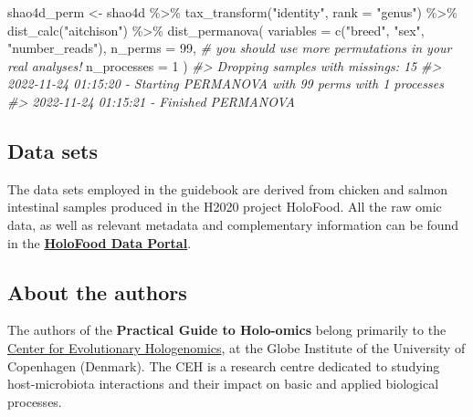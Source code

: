 \documentclass[
]{book}
\newenvironment{Shaded}{\begin{snugshade}}{\end{snugshade}}
\newcommand{\AttributeTok}[1]{\textcolor[rgb]{0.77,0.63,0.00}{#1}}
\newcommand{\CommentTok}[1]{\textcolor[rgb]{0.56,0.35,0.01}{\textit{#1}}}
\newcommand{\DecValTok}[1]{\textcolor[rgb]{0.00,0.00,0.81}{#1}}
\newcommand{\FunctionTok}[1]{\textcolor[rgb]{0.00,0.00,0.00}{#1}}
\newcommand{\NormalTok}[1]{#1}
\newcommand{\OtherTok}[1]{\textcolor[rgb]{0.56,0.35,0.01}{#1}}
\newcommand{\SpecialCharTok}[1]{\textcolor[rgb]{0.00,0.00,0.00}{#1}}
\newcommand{\StringTok}[1]{\textcolor[rgb]{0.31,0.60,0.02}{#1}}
\begin{document}
\begin{Shaded}
\begin{Highlighting}[]
\NormalTok{shao4d\_perm }\OtherTok{\textless{}{-}}\NormalTok{ shao4d }\SpecialCharTok{\%\textgreater{}\%}
  \FunctionTok{tax\_transform}\NormalTok{(}\StringTok{"identity"}\NormalTok{, }\AttributeTok{rank =} \StringTok{"genus"}\NormalTok{) }\SpecialCharTok{\%\textgreater{}\%}
  \FunctionTok{dist\_calc}\NormalTok{(}\StringTok{"aitchison"}\NormalTok{) }\SpecialCharTok{\%\textgreater{}\%}
  \FunctionTok{dist\_permanova}\NormalTok{(}
    \AttributeTok{variables =} \FunctionTok{c}\NormalTok{(}\StringTok{"breed"}\NormalTok{, }\StringTok{"sex"}\NormalTok{, }\StringTok{"number\_reads"}\NormalTok{),}
    \AttributeTok{n\_perms =} \DecValTok{99}\NormalTok{, }\CommentTok{\# you should use more permutations in your real analyses!}
    \AttributeTok{n\_processes =} \DecValTok{1}
\NormalTok{  )}
\CommentTok{\#\textgreater{} Dropping samples with missings: 15}
\CommentTok{\#\textgreater{} 2022{-}11{-}24 01:15:20 {-} Starting PERMANOVA with 99 perms with 1 processes}
\CommentTok{\#\textgreater{} 2022{-}11{-}24 01:15:21 {-} Finished PERMANOVA}
\end{Highlighting}
\end{Shaded}

\normalsize

\hypertarget{datasets}{%
\subsection*{Data sets}\label{datasets}}

The data sets employed in the guidebook are derived from chicken and salmon intestinal samples produced in the H2020 project HoloFood. All the raw omic data, as well as relevant metadata and complementary information can be found in the \textbf{\href{https://www.holofooddata.org}{HoloFood Data Portal}}.

\hypertarget{about-the-authors}{%
\subsection*{About the authors}\label{about-the-authors}}

The authors of the \textbf{Practical Guide to Holo-omics} belong primarily to the \href{https://ceh.ku.dk/}{Center for Evolutionary Hologenomics}, at the Globe Institute of the University of Copenhagen (Denmark). The CEH is a research centre dedicated to studying host-microbiota interactions and their impact on basic and applied biological processes.
\end{document}
